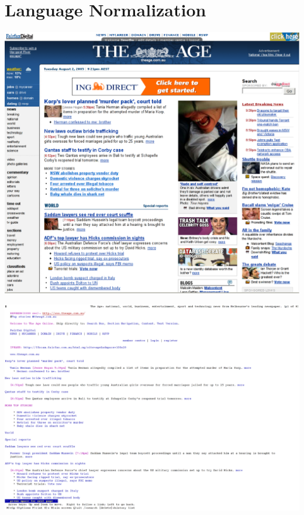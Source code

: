\documentclass[a4paper,landscape,headrule,footrule,xetex]{foils}
\begin{document}
\section{Language Normalization}


\begin{center}
  \includegraphics[height=0.95\textheight]{../pics/firefox.eps}
\end{center}






\begin{center}
  \includegraphics[height=0.95\textheight]{../pics/lynx.eps}
\end{center}
\end{document}
